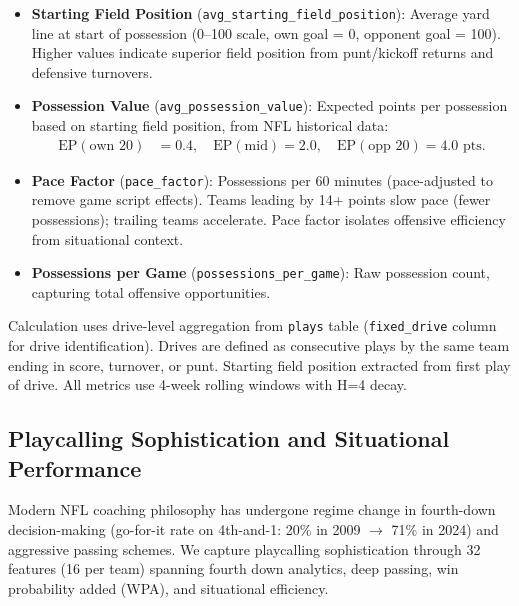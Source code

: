 \begin{itemize}
  \item \textbf{Starting Field Position} (\texttt{avg\_starting\_field\_position}): Average yard line at start of possession (0--100 scale, own goal = 0, opponent goal = 100). Higher values indicate superior field position from punt/kickoff returns and defensive turnovers.

  \item \textbf{Possession Value} (\texttt{avg\_possession\_value}): Expected points per possession based on starting field position, from NFL historical data:
  \begin{align}
    \text{EP}(\text{own 20}) &= 0.4, \quad
    \text{EP}(\text{mid}) = 2.0, \quad
    \text{EP}(\text{opp 20}) = 4.0 \text{ pts}.
  \end{align}

  \item \textbf{Pace Factor} (\texttt{pace\_factor}): Possessions per 60 minutes (pace-adjusted to remove game script effects). Teams leading by 14+ points slow pace (fewer possessions); trailing teams accelerate. Pace factor isolates offensive efficiency from situational context.

  \item \textbf{Possessions per Game} (\texttt{possessions\_per\_game}): Raw possession count, capturing total offensive opportunities.
\end{itemize}

Calculation uses drive-level aggregation from \texttt{plays} table (\texttt{fixed\_drive} column for drive identification). Drives are defined as consecutive plays by the same team ending in score, turnover, or punt. Starting field position extracted from first play of drive. All metrics use 4-week rolling windows with H=4 decay.

\subsection{Playcalling Sophistication and Situational Performance}
\label{subsec:playcalling-features}

Modern NFL coaching philosophy has undergone regime change in fourth-down decision-making (go-for-it rate on 4th-and-1: 20\% in 2009 $\to$ 71\% in 2024) and aggressive passing schemes. We capture playcalling sophistication through 32 features (16 per team) spanning fourth down analytics, deep passing, win probability added (WPA), and situational efficiency.

